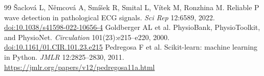 \documentclass[11pt,a4paper]{article}
\begin{document}
\begin{thebibliography}{99}
 Šaclová L, Němcová A, Smíšek R, Smital L, Vítek M, Ronzhina M. Reliable P wave detection in pathological ECG signals. \emph{Sci Rep} 12:6589, 2022. \href{https://doi.org/10.1038/s41598-022-10656-4}{doi:10.1038/s41598-022-10656-4}
 Goldberger AL et al. PhysioBank, PhysioToolkit, and PhysioNet. \emph{Circulation} 101(23):e215--e220, 2000. \href{https://doi.org/10.1161/01.CIR.101.23.e215}{doi:10.1161/01.CIR.101.23.e215}
 Pedregosa F et al. Scikit-learn: machine learning in Python. \emph{JMLR} 12:2825--2830, 2011. \url{https://jmlr.org/papers/v12/pedregosa11a.html}
\end{thebibliography}
\end{document}
